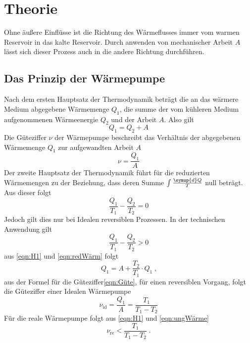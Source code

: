 \section{Theorie}
\label{sec:Theorie}
Ohne äußere Einflüsse ist die Richtung des Wärmeflusses immer vom warmen Reservoir in das kalte Reservoir.
Durch anwenden von mechanischer Arbeit $A$ lässt sich dieser Prozess auch in die andere Richtung durchführen.
\subsection{Das Prinzip der Wärmepumpe}
Nach dem ersten Hauptsatz der Thermodynamik beträgt die an das wärmere Medium abgegebene Wärmemenge $Q_1$, die summe der vom kühleren Medium aufgenommenen
Wärmeenergie $Q_2$ und der Arbeit $A$. Also gilt
\begin{equation}
    Q_1=Q_2+A
    \label{eqn:H1}
\end{equation}
Die Güteziffer $\nu$ der Wärmepumpe beschreibt das Verhältnis der abgegebenen
Wärmemenge $Q_1$ zur aufgewandten Arbeit $A$
\begin{equation}
    \nu=\frac{Q_1}{A}
    \label{eqn:Güte}
\end{equation}
Der zweite Hauptsatz der Thermodynamik führt für die reduzierten Wärmemengen 
zu der Beziehung, dass deren Summe $\int \frac{\symup{d}Q}{T}$ null beträgt. 
Aus dieser folgt
\begin{equation}
    \frac{Q_1}{T_1} - \frac{Q_2}{T_2} = 0
    \label{eqn:redWärm}
\end{equation}
Jedoch gilt dies nur bei Idealen reversiblen Prozessen. In der technischen Anwendung gilt
\begin{equation}
    \frac{Q_1}{T_1} - \frac{Q_2}{T_2} > 0
    \label{eqn:ungWärme}
\end{equation}
aus \ref{eqn:H1} und \ref{eqn:redWärm} folgt
\begin{equation*}
    Q_1 = A + \frac{T_2}{T_1} \cdot Q_1 \; \text{,}
\end{equation*}
aus der Formel für die Güteziffer\ref{eqn:Güte}, für einen reversiblen Vorgang, folgt die Güteziffer einer Idealen Wärmepumpe
\begin{equation}
    \nu_\text{id} = \frac{Q_1}{A} = \frac{T_1}{T_1 - T_2}
    \label{eqn:Id}
\end{equation}
Für die reale Wärmepumpe folgt aus \ref{eqn:H1} und \ref{eqn:ungWärme}
\begin{equation}
    \nu_\text{re} < \frac{T_1}{T_1 - T_2} \; \text{.}
    \label{eqn:Re}
\end{equation}
